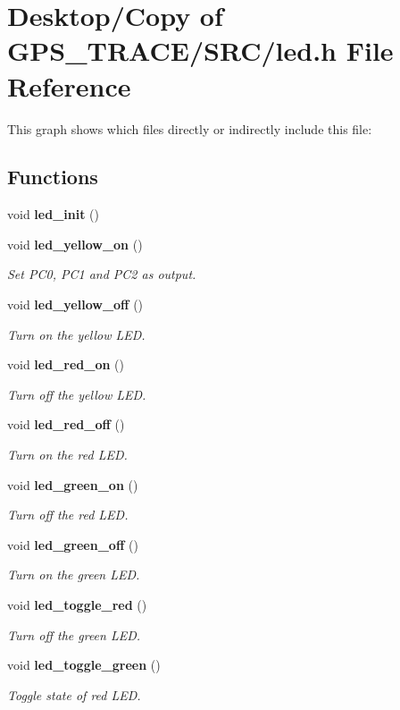 \section{Desktop/Copy of GPS\_\-TRACE/SRC/led.h File Reference}
\label{led_8h}


This graph shows which files directly or indirectly include this file:\subsection*{Functions}
\begin{CompactItemize}
\item 
void {\bf led\_\-init} ()
\item 
void {\bf led\_\-yellow\_\-on} ()
\begin{CompactList}\small\item\em Set PC0, PC1 and PC2 as output. \item\end{CompactList}\item 
void {\bf led\_\-yellow\_\-off} ()
\begin{CompactList}\small\item\em Turn on the yellow LED. \item\end{CompactList}\item 
void {\bf led\_\-red\_\-on} ()
\begin{CompactList}\small\item\em Turn off the yellow LED. \item\end{CompactList}\item 
void {\bf led\_\-red\_\-off} ()
\begin{CompactList}\small\item\em Turn on the red LED. \item\end{CompactList}\item 
void {\bf led\_\-green\_\-on} ()
\begin{CompactList}\small\item\em Turn off the red LED. \item\end{CompactList}\item 
void {\bf led\_\-green\_\-off} ()
\begin{CompactList}\small\item\em Turn on the green LED. \item\end{CompactList}\item 
void {\bf led\_\-toggle\_\-red} ()
\begin{CompactList}\small\item\em Turn off the green LED. \item\end{CompactList}\item 
void {\bf led\_\-toggle\_\-green} ()
\begin{CompactList}\small\item\em Toggle state of red LED. \item\end{CompactList}\end{CompactItemize}
